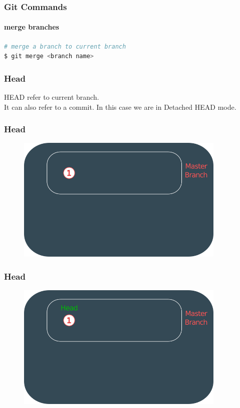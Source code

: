 \documentclass{beamer}
\begin{document}
	\begin{frame}[fragile]
		\frametitle{Git Commands}
		\framesubtitle{merge branches}	
		
\begin{lstlisting}[language=bash]
# merge a branch to current branch
$ git merge <branch name>
\end{lstlisting}
	
	\end{frame}
	
	\begin{frame}
		\frametitle{Head}
		\textcolor{secondary}{HEAD} refer to current branch.\\
		It can also refer to a commit. In this case we are in \textcolor{secondary}{Detached HEAD} mode.
	\end{frame}	
	
	\begin{frame}
		\frametitle{Head}
		\begin{figure}[htbp]
			\centering
			\includegraphics[width=10cm]{head1}
		\end{figure}
	\end{frame}
	
	\begin{frame}
		\frametitle{Head}
		\begin{figure}[htbp]
			\centering
			\includegraphics[width=10cm]{head2}
		\end{figure}
	\end{frame}
	
\end{document}
